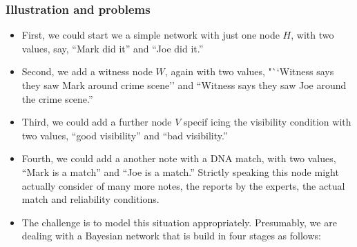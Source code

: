 \documentclass[
  11pt,
  dvipsnames,enabledeprecatedfontcommands]{scrartcl}
\begin{document}
\hypertarget{illustration-and-problems}{%
\subsubsection{Illustration and
problems}\label{illustration-and-problems}}

\begin{itemize}
\item
  First, we could start we a simple network with just one node \(H\),
  with two values, say, ``Mark did it'' and ``Joe did it.''
\item
  Second, we add a witness node \(W\), again with two values, "``Witness
  says they saw Mark around crime scene'' and ``Witness says they saw
  Joe around the crime scene.''
\item
  Third, we could add a further node \(V\) specif icing the visibility
  condition with two values, ``good visibility'' and ``bad visibility.''
\item
  Fourth, we could add a another note with a DNA match, with two values,
  ``Mark is a match'' and ``Joe is a match.'' Strictly speaking this
  node might actually consider of many more notes, the reports by the
  experts, the actual match and reliability conditions.
\item
  The challenge is to model this situation appropriately. Presumably, we
  are dealing with a Bayesian network that is build in four stages as
  follows:


\end{itemize}
\end{document}
